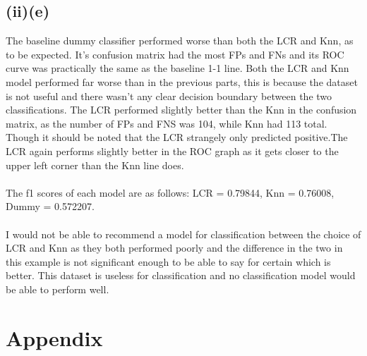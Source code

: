 \documentclass{article}
\begin{document}
\subsection{(ii)(e)}

The baseline dummy classifier performed worse than both the LCR and Knn, as to be expected. It's confusion matrix had the most FPs and FNs and its ROC curve was practically the same as the baseline 1-1 line. Both the LCR and Knn model performed far worse than in the previous parts, this is because the dataset is not useful and there wasn't any clear decision boundary between the two classifications. 
The LCR performed slightly better than the Knn in the confusion matrix, as the number of FPs and FNS was 104, while Knn had 113 total. Though it should be noted that the LCR strangely only predicted positive.The LCR again performs slightly better in the ROC graph as it gets closer to the upper left corner than the Knn line does.
\\
\\
The f1 scores of each model are as follows: LCR = 0.79844, Knn = 0.76008, Dummy = 0.572207.
\\
\\
I would not be able to recommend a model for classification between the choice of LCR and Knn as they both performed poorly and the difference in the two in this example is not significant enough to be able to say for certain which is better. This dataset is useless for classification and no classification model would be able to perform well.

\section{Appendix}

\end{document}
